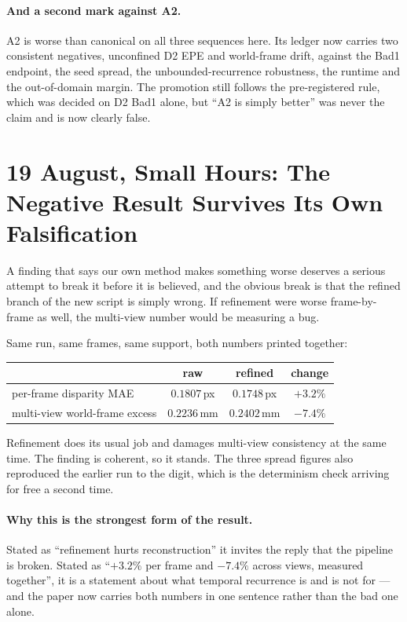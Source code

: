\documentclass[11pt,a4paper]{article}
\begin{document}
\paragraph{And a second mark against A2.} A2 is worse than canonical on all three
sequences here. Its ledger now carries two consistent negatives, unconfined D2
EPE and world-frame drift, against the Bad1 endpoint, the seed spread, the
unbounded-recurrence robustness, the runtime and the out-of-domain margin. The
promotion still follows the pre-registered rule, which was decided on D2 Bad1
alone, but ``A2 is simply better'' was never the claim and is now clearly false.


\section*{19 August, Small Hours: The Negative Result Survives Its Own Falsification}

A finding that says our own method makes something worse deserves a serious
attempt to break it before it is believed, and the obvious break is that the
refined branch of the new script is simply wrong. If refinement were worse
frame-by-frame as well, the multi-view number would be measuring a bug.

Same run, same frames, same support, both numbers printed together:

\begin{center}
\begin{tabular}{lccc}
\toprule
& raw & refined & change \\
\midrule
per-frame disparity MAE       & $0.1807$\,px & $0.1748$\,px & $+3.2\%$ \\
multi-view world-frame excess & $0.2236$\,mm & $0.2402$\,mm & $-7.4\%$ \\
\bottomrule
\end{tabular}
\end{center}

Refinement does its usual job and damages multi-view consistency at the same
time. The finding is coherent, so it stands. The three spread figures also
reproduced the earlier run to the digit, which is the determinism check arriving
for free a second time.

\paragraph{Why this is the strongest form of the result.} Stated as ``refinement
hurts reconstruction'' it invites the reply that the pipeline is broken. Stated
as ``$+3.2\%$ per frame and $-7.4\%$ across views, measured together'', it is a
statement about what temporal recurrence is and is not for --- and the paper now
carries both numbers in one sentence rather than the bad one alone.
\end{document}
